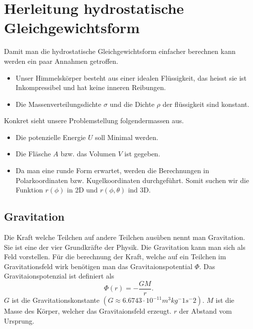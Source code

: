 %
%
%
%
\section{Herleitung hydrostatische Gleichgewichtsform
\label{planet:section:teil1}}
Damit man die hydrostatische Gleichgewichtsform einfacher berechnen kann werden ein paar Annahmen getroffen.
\begin{itemize}
	\item Unser Himmelskörper besteht aus einer idealen Flüssigkeit, das heisst sie ist Inkompressibel und hat keine inneren Reibungen.
	\item Die Massenverteilungsdichte \(\sigma\) und die Dichte \(\rho\) der flüssigkeit sind konstant.	
\end{itemize}

Konkret sieht unsere Problemstellung folgendermassen aus.
\begin{itemize}
	\item Die potenzielle Energie \(U\) soll Minimal werden.
	\item Die Fläsche \(A\) bzw. das Volumen \(V\) ist gegeben.
	\item Da man eine runde Form erwartet, werden die Berechnungen in Polarkoordinaten bzw. Kugelkoordinaten durchgeführt. Somit suchen wir die Funktion \(r(\phi)\) in 2D und \(r(\phi,\theta)\) ind 3D.
\end{itemize}

\subsection{Gravitation}

Die Kraft welche Teilchen auf andere Teilchen ausüben nennt man Gravitation.
Sie ist eine der vier Grundkräfte der Physik.
Die Gravitation kann man sich als Feld vorstellen.
Für die berechnung der Kraft, welche auf ein Teilchen im Gravitationsfeld wirk benötigen man das Gravitaionspotential \(\Phi\).
Das Gravitaionspotenzial ist definiert als
\begin{equation}
	\Phi(r) = -\frac{GM}{r}.
	\label{planet:equ:gravpot}
\end{equation}
\(G\) ist die Gravitationskonstante \((G \approx 6.6743 \cdot 10^{-11} m^3 kg^-1 s^-2)\).
\(M\) ist die Masse des Körper, welcher das Gravitaionsfeld erzeugt.
\(r\) der Abstand vom Ursprung.

